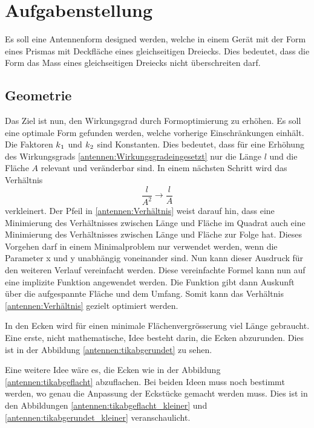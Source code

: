 %
%
% 
%
%
\section{Aufgabenstellung\label{antennen:problemstellung}}
 Es soll eine Antennenform designed werden, welche in einem Gerät mit der Form 
 eines Prismas mit Deckfläche eines gleichseitigen Dreiecks. Dies bedeutet, dass 
 die Form das Mass eines gleichseitigen Dreiecks nicht überschreiten darf.
 
\subsection{Geometrie\label{antennen:Geom}}
Das Ziel ist nun, den Wirkungsgrad durch Formoptimierung zu erhöhen. Es soll eine optimale Form
gefunden werden, welche vorherige Einschränkungen einhält.
Die Faktoren $k\textsubscript{1}$ und $k\textsubscript{2}$ sind Konstanten. 
Dies bedeutet, dass für eine Erhöhung des Wirkungsgrads \eqref{antennen:Wirkungsgradeingesetzt} nur die Länge 
$l$ und die Fläche $A$ relevant und veränderbar sind. In einem nächsten Schritt wird das Verhältnis
\begin{equation}
	\frac{l}{A^2} \rightarrow \frac{l}{A}
	\label{antennen:Verhältnis}
\end{equation}
verkleinert. 
Der Pfeil in \eqref{antennen:Verhältnis} weist darauf hin, dass eine Minimierung des Verhältnisses zwischen Länge und Fläche im Quadrat auch eine Minimierung des Verhältnisses zwischen Länge und Fläche zur Folge hat. Dieses Vorgehen darf in einem Minimalproblem nur verwendet werden, wenn die Parameter x und y unabhängig voneinander sind. Nun kann dieser Ausdruck 
für den weiteren Verlauf vereinfacht werden. Diese vereinfachte Formel kann nun auf eine implizite 
Funktion angewendet werden. Die Funktion gibt dann Auskunft über die aufgespannte Fläche und 
dem Umfang. Somit kann das Verhältnis \eqref{antennen:Verhältnis} gezielt optimiert werden. 

In den Ecken wird für einen minimale Flächenvergrösserung viel Länge gebraucht.
Eine erste, nicht mathematische, Idee besteht darin, die Ecken abzurunden. Dies ist in der Abbildung
\ref{antennen:tikabgerundet} zu sehen. 

Eine weitere Idee wäre es, die Ecken wie in der Abbildung \ref{antennen:tikabgeflacht} abzuflachen. Bei
beiden Ideen muss noch bestimmt werden, wo genau die Anpassung der Eckstücke gemacht werden muss. Dies ist in den Abbildungen 
\ref{antennen:tikabgeflacht_kleiner} und \ref{antennen:tikabgerundet_kleiner} veranschaulicht.

